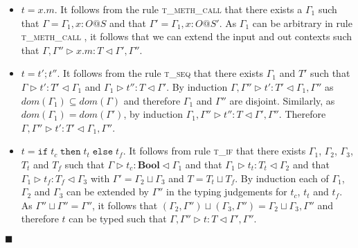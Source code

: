 \documentclass{article}
\newcommand{\tif}{\textsc{t\_if} }
\newcommand{\tseq}{\textsc{t\_seq} }
\newcommand{\tmethc}{\textsc{t\_meth\_call} }
\newcommand{\typerule}[4]{#1 \triangleright #2 : #3 \triangleleft #4}
\newcommand{\boolt}{\mathbf{Bool}}
\newcommand{\ift}[3]{\mathtt{if} \; #1 \; \mathtt{then} \; #2 \; \mathtt{else} \; #3}
\newcommand{\qed}{$\blacksquare$}
\newenvironment{proof}{\vspace{1ex}\noindent{\bf Proof}\hspace{0.5em}}
  {\hfill\qed\vspace{1ex}}
\begin{document}
\begin{proof}
\begin{itemize}
\item $t = x.m$. It follows from the rule \tmethc that there exists
a $\Gamma_1$ such that $\Gamma = \Gamma_1, x : O@S$ and that $\Gamma' = \Gamma_1, x : O@S'$.
As $\Gamma_1$ can be arbitrary in rule \tmethc, it follows that we can
extend the input and out contexts such that
$\typerule{\Gamma, \Gamma''}{x.m}{T}{\Gamma', \Gamma''}$.

\item $t = t' ; t''$. It follows from the rule \tseq that there exists
$\Gamma_1$ and $T'$ such that $\typerule{\Gamma}{t'}{T'}{\Gamma_1}$
and $\typerule{\Gamma_1}{t''}{T}{\Gamma'}$. By induction
$\typerule{\Gamma, \Gamma''}{t'}{T'}{\Gamma_1, \Gamma''}$
as $dom(\Gamma_1) \subseteq dom(\Gamma)$ and therefore
$\Gamma_1$ and $\Gamma''$ are disjoint.
Similarly, as $dom(\Gamma_1) = dom(\Gamma')$, by induction
$\typerule{\Gamma_1, \Gamma''}{t''}{T}{\Gamma', \Gamma''}$.
Therefore $\typerule{\Gamma, \Gamma''}{t'}{T'}{\Gamma_1, \Gamma''}$.

\item $t = \ift{t_c}{t_t}{t_f}$. It follows from rule \tif that there
exists $\Gamma_1$, $\Gamma_2$, $\Gamma_3$, $T_t$ and $T_f$ such that
$\typerule{\Gamma}{t_c}{\boolt}{\Gamma_1}$ and that
$\typerule{\Gamma_1}{t_t}{T_t}{\Gamma_2}$ and that
$\typerule{\Gamma_1}{t_f}{T_f}{\Gamma_3}$ with
$\Gamma' = \Gamma_2 \sqcup \Gamma_3$ and $T = T_t \sqcup T_f$.
By induction each of $\Gamma_1$, $\Gamma_2$ and $\Gamma_3$ can
be extended by $\Gamma''$ in the typing judgements for $t_c$,
$t_t$ and $t_f$. As $\Gamma'' \sqcup \Gamma'' = \Gamma''$, it
follows that $(\Gamma_2, \Gamma'') \sqcup (\Gamma_3, \Gamma'') = 
\Gamma_2 \sqcup \Gamma_3, \Gamma''$ and therefore $t$ can be
typed such that $\typerule{\Gamma, \Gamma''}{t}{T}{\Gamma', \Gamma''}$.

\end{itemize}

\end{proof}
\end{document}
